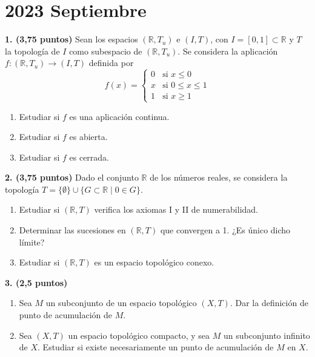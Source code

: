 \clearpage
\chapter*{2023 Septiembre}

\begin{enunciado}
    \hypertarget{2023 S 1}{}
    \textbf{1. (3,75 puntos)} Sean los espacios \((\mathbb{R},T_u)\) e \((I,T)\), con \(I=[0,1]\subset \mathbb{R}\) y \(T\) la topología de \(I\) como subespacio de \((\mathbb{R},T_u)\). Se considera la aplicación \(f:(\mathbb{R},T_u)\to (I,T)\) definida por
    \[
        f(x) = \begin{cases}
            0 & \text{si } x \leq 0 \\
            x & \text{si } 0 \leq x \leq 1 \\
            1 & \text{si } x \geq 1
        \end{cases}
    \]
    \begin{enumerate}[label=\alph*)]
        \item Estudiar si \(f\) es una aplicación continua.
        \item Estudiar si \(f\) es abierta.
        \item Estudiar si \(f\) es cerrada.
    \end{enumerate}
\end{enunciado}

\begin{enunciado}
    \hypertarget{2023 S 2}{}
    \textbf{2. (3,75 puntos)} Dado el conjunto \(\mathbb{R}\) de los números reales, se considera la topología \(T = \{\emptyset\} \cup \{G \subset \mathbb{R} \mid 0 \in G\}\).
    \begin{enumerate}[label=\alph*)]
        \item Estudiar si \((\mathbb{R},T)\) verifica los axiomas I y II de numerabilidad.
        \item Determinar las sucesiones en \((\mathbb{R},T)\) que convergen a 1. ¿Es único dicho límite?
        \item Estudiar si \((\mathbb{R},T)\) es un espacio topológico conexo.
    \end{enumerate}
\end{enunciado}

\begin{enunciado}
    \hypertarget{2023 S 3}{}
    \textbf{3. (2,5 puntos)}
    \begin{enumerate}[label=\alph*)]
        \item Sea \(M\) un subconjunto de un espacio topológico \((X,T)\). Dar la definición de punto de acumulación de \(M\).
        \item Sea \((X,T)\) un espacio topológico compacto, y sea \(M\) un subconjunto infinito de \(X\). Estudiar si existe necesariamente un punto de acumulación de \(M\) en \(X\).
    \end{enumerate}
\end{enunciado}